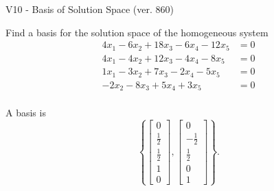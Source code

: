 \begin{exercise}
  \begin{exerciseTitle}V10 - Basis of Solution Space (ver. 860)\end{exerciseTitle}
  \begin{exerciseStatement}
    Find a basis for the solution space of the homogeneous system 
\begin{align*}
 4 x_ 1 -6 x_ 2 + 18 x_ 3 -6 x_ 4 -12 x_ 5 &= 0  \\ 
  4 x_ 1 -4 x_ 2 + 12 x_ 3 -4 x_ 4 -8 x_ 5 &= 0  \\ 
  1 x_ 1 -3 x_ 2 + 7 x_ 3 -2 x_ 4 -5 x_ 5 &= 0  \\ 
  -2 x_ 2 -8 x_ 3 + 5 x_ 4 + 3 x_ 5 &= 0  \\ 
 \end{align*}


 
  \end{exerciseStatement}

  \begin{exerciseAnswer}
   A basis is   
\[\left\{\left[\begin{array}{c}
0 \\
\frac{1}{2} \\
\frac{1}{2} \\
1 \\
0
\end{array}\right] , \left[\begin{array}{c}
0 \\
-\frac{1}{2} \\
\frac{1}{2} \\
0 \\
1
\end{array}\right]\right\}.\]

  


  \end{exerciseAnswer}
\end{exercise}